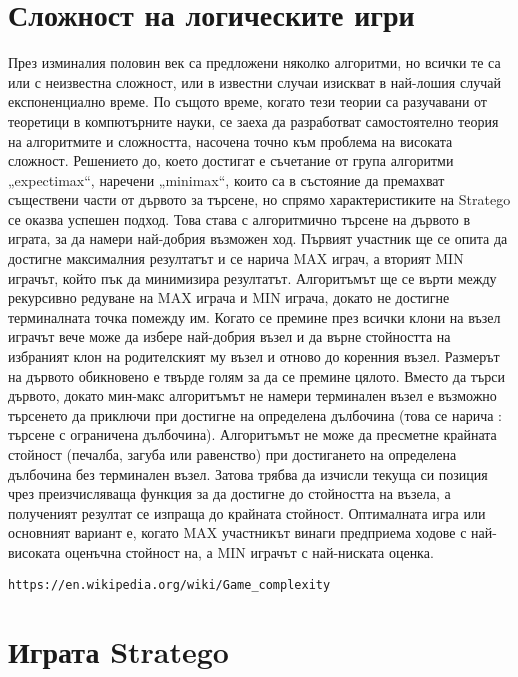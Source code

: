 \section{Сложност на логическите игри}

През изминалия половин век са предложени няколко алгоритми, но всички те са или с неизвестна сложност, или в известни случаи изискват в най-лошия случай експоненциално време. По същото време, когато тези теории са разучавани от теоретици в компютърните науки, се заеха да разработват самостоятелно теория на алгоритмите и сложността, насочена точно към проблема на високата сложност. Решението до, което достигат е съчетание от група алгоритми „expectimax“, наречени  „minimax“, които са в състояние да премахват съществени части от дървото за търсене, но спрямо характеристиките на Stratego се оказва успешен подход. Това става с алгоритмично търсене на дървото в играта, за да намери най-добрия възможен ход. Първият участник ще се опита да достигне максималния резултатът и се нарича MAX играч, а вторият MIN играчът, който пък да минимизира резултатът. Алгоритъмът ще се върти между рекурсивно редуване на MAX играча и MIN играча, докато не достигне  терминалната точка помежду им. Когато се премине през всички клони на възел играчът вече може да избере най-добрия възел и да върне стойността на избраният клон на родителският му възел и отново до коренния възел. Размерът на дървото обикновено е твърде голям за да се премине цялото. Вместо да търси дървото, докато мин-макс алгоритъмът не намери терминален възел е възможно търсенето да приключи при достигне на определена дълбочина (това се нарича : търсене с ограничена дълбочина). Алгоритъмът не може да пресметне крайната стойност (печалба, загуба или равенство) при достигането на определена дълбочина без терминален възел. Затова трябва да изчисли текуща си позиция чрез преизчисляваща функция за да достигне до стойността на възела, а полученият резултат се изпраща до крайната стойност. Оптималната игра или основният вариант е, когато MAX участникът винаги предприема ходове с най-високата оценъчна стойност на, а MIN играчът с най-ниската оценка.

\begin{lstlisting}
https://en.wikipedia.org/wiki/Game_complexity
\end{lstlisting}

\section{Играта Stratego}

